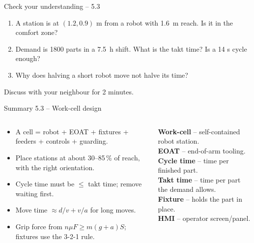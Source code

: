 \documentclass[aspectratio=169,10pt]{beamer}
\begin{document}
\begin{frame}[t]{Check your understanding -- 5.3}
\vspace{4mm}
\begin{keybox}
\large
\begin{enumerate}
\item A station is at $(1.2, 0.9)$ m from a robot with \SI{1.6}{m} reach. Is it in the comfort zone?\\[3mm]
\item Demand is 1800 parts in a \SI{7.5}{h} shift. What is the takt time? Is a 14 s cycle enough?\\[3mm]
\item Why does halving a short robot move not halve its time?
\end{enumerate}
\end{keybox}
\vfill
\centering\small\color{mkGray} Discuss with your neighbour for 2 minutes.
\end{frame}

\begin{frame}{Summary 5.3 -- Work-cell design}
\begin{columns}[T,onlytextwidth]
\begin{keybox}
\small
\begin{itemize}
\item A cell = robot + EOAT + fixtures + feeders + controls + guarding.
\item Place stations at about 30--85\,\% of reach, with the right orientation.
\item Cycle time must be $\le$ takt time; remove waiting first.
\item Move time $\approx d/v + v/a$ for long moves.
\item Grip force from $n\mu F \ge m(g+a)S$; fixtures use the 3-2-1 rule.
\end{itemize}
\end{keybox}
\begin{defbox}
\small
\textbf{Work-cell} -- self-contained robot station.\\
\textbf{EOAT} -- end-of-arm tooling.\\
\textbf{Cycle time} -- time per finished part.\\
\textbf{Takt time} -- time per part the demand allows.\\
\textbf{Fixture} -- holds the part in place.\\
\textbf{HMI} -- operator screen/panel.
\end{defbox}
\end{columns}
\end{frame}
\end{document}
